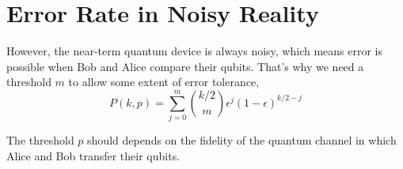 \documentclass[11pt]{article}
\begin{document}






\section{Error Rate in Noisy Reality}


However, the near-term quantum device is always noisy, which means error is possible when Bob and Alice compare their qubits.
That's why we need a threshold $m$ to allow some extent of error tolerance,
\[
    P(k,p)=\sum_{j=0}^{m} \binom{k/2}{m} \epsilon^j(1-\epsilon)^{k/2-j}
\]

The threshold $p$ should depends on the fidelity of the quantum channel in which Alice and 
Bob transfer their qubits.
\end{document}
